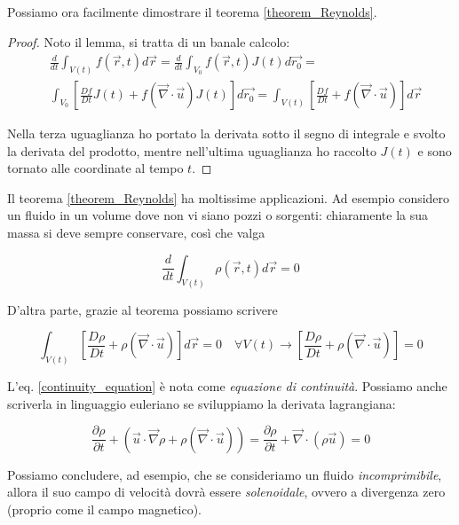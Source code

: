 \documentclass{report}
\begin{document}
Possiamo ora facilmente dimostrare il teorema \ref{theorem_Reynolds}. 
\begin{proof}

    Noto il lemma, si tratta di un banale calcolo: 
    \begin{align}
        &\frac{d}{dt}\int_{V(t)}f(\vec{r}, t)d\vec{r} = \frac{d}{dt}\int_{V_0}f(\vec{r}, t)J(t)d\vec{r_0} =\\
        & \int_{V_0}\left[\frac{Df}{Dt}J(t) + f(\vec{\nabla} \cdot \vec{u})J(t)\right]d\vec{r_0} = \int_{V(t)}\left[\frac{Df}{Dt} + f(\vec{\nabla} \cdot \vec{u})\right]d\vec{r}
    \end{align}

    Nella terza uguaglianza ho portato la derivata sotto il segno di integrale e svolto la derivata del prodotto, mentre nell'ultima uguaglianza ho raccolto $J(t)$ e sono tornato alle coordinate al tempo $t$. 
\end{proof}

Il teorema \ref{theorem_Reynolds} ha moltissime applicazioni. Ad esempio considero un fluido in un volume dove non vi siano pozzi o sorgenti: chiaramente la sua massa si deve sempre conservare, così che valga 

\begin{equation}
    \frac{d}{dt}\int_{V(t)}\rho(\vec{r}, t)d\vec{r} = 0 
\end{equation}

D'altra parte, grazie al teorema possiamo scrivere 
\begin{tcolorbox}[colback=myg!15, colframe=black, boxrule=1pt]
\begin{equation}
    \label{continuity_equation}
    \int_{V(t)}\left[\frac{D\rho}{Dt}+ \rho(\vec{\nabla} \cdot \vec{u})\right]d\vec{r} = 0 \quad \forall V(t) \rightarrow \left[\frac{D\rho}{Dt}+ \rho(\vec{\nabla} \cdot \vec{u})\right] = 0
\end{equation}
\end{tcolorbox}

L'eq. \ref{continuity_equation} è nota come \emph{equazione di continuità}. Possiamo anche scriverla in linguaggio euleriano se sviluppiamo la derivata lagrangiana: 

\begin{equation}
    \frac{\partial \rho}{\partial t} + (\vec{u} \cdot \vec{\nabla}\rho + \rho(\vec{\nabla} \cdot \vec{u})) = \frac{\partial \rho}{\partial t} + \vec{\nabla}\cdot(\rho\vec{u}) = 0
\end{equation}

Possiamo concludere, ad esempio, che se consideriamo un fluido \emph{incomprimibile}, allora il suo campo di velocità dovrà essere \emph{solenoidale}, ovvero a divergenza zero (proprio come il campo magnetico).  \\
\end{document}
